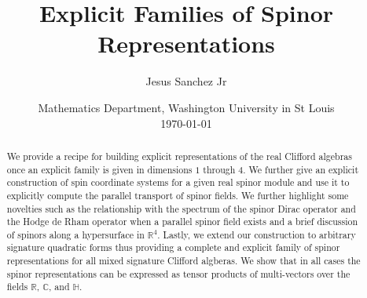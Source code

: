 \documentclass[openany, 11pt]{article}
\title{Explicit Families of Spinor Representations}
\author{Jesus Sanchez Jr}
\date{
    Mathematics Department, Washington University in St Louis\\[2ex]
    \today
}
\theoremstyle{definition}
\theoremstyle{remark}
\def\bC{\ensuremath{\mathbb{C}}}
\def\bH{\ensuremath{\mathbb{H}}}
\def\bR{\ensuremath{\mathbb{R}}}
\begin{document}
\maketitle
\begin{abstract}
    We provide a recipe for building explicit representations of the real Clifford algebras once an explicit family is given in dimensions $1$ through $4$. We further give an explicit construction of spin coordinate systems for a given real spinor module and use it to explicitly compute the parallel transport of spinor fields. We further highlight some novelties such as the relationship with the spectrum of the spinor Dirac operator and the Hodge de Rham operator when a parallel spinor field exists and a brief discussion of spinors along a hypersurface in $\bR^4$. Lastly, we extend our construction to arbitrary signature quadratic forms thus providing a complete and explicit family of spinor representations for all mixed signature Clifford algberas. We show that in all cases the spinor representations can be expressed as tensor products of multi-vectors over the fields $\bR$, $\bC$, and $\bH$.
\end{abstract}
{
  \hypersetup{linkcolor=black}
  \tableofcontents
}
\end{document}
